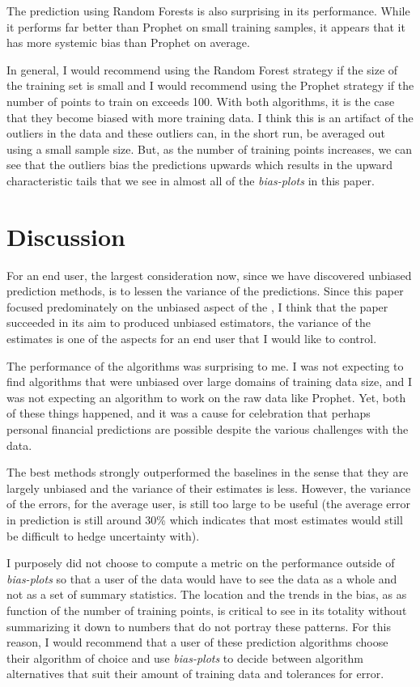 \documentclass[11pt,a4paper]{article}
\newcommand{\bplots}{\textit{bias-plots}\xspace}
\begin{document}
The \yinyang prediction using Random Forests is also surprising in its performance. While it performs far better than Prophet on small training samples, it appears that it has more systemic bias than Prophet on average. 

In general, I would recommend using the \yinyang Random Forest strategy if the size of the training set is small and I would recommend using the Prophet strategy if the number of points to train on exceeds 100. With both algorithms, it is the case that they become biased with more training data. I think this is an artifact of the outliers in the data and these outliers can, in the short run, be averaged out using a small sample size. But, as the number of training points increases, we can see that the outliers bias the predictions upwards which results in the upward characteristic tails that we see in almost all of the \bplots in this paper. 




\section{Discussion}

For an end user, the largest consideration now, since we have discovered unbiased prediction methods, is to lessen the variance of the predictions. Since this paper focused predominately on the unbiased aspect of the \preprob, I think that the paper succeeded in its aim to produced unbiased estimators, the variance of the estimates is one of the aspects for an end user that I would like to control. 

The performance of the algorithms was surprising to me. I was not expecting to find algorithms that were unbiased over large domains of training data size, and I was not expecting an algorithm to work on the raw data like Prophet. Yet, both of these things happened, and it was a cause for celebration that perhaps personal financial predictions are possible despite the various challenges with the data. 

The best methods strongly outperformed the baselines in the sense that they are largely unbiased and the variance of their estimates is less. However, the variance of the errors, for the average user, is still too large to be useful (the average error in prediction is still around 30\% which indicates that most estimates would still be difficult to hedge uncertainty with). 

I purposely did not choose to compute a metric on the performance outside of \bplots so that a user of the data would have to see the data as a whole and not as a set of summary statistics. The location and the trends in the bias, as as function of the number of training points, is critical to see in its totality without summarizing it down to numbers that do not portray these patterns. For this reason, I would recommend that a user of these prediction algorithms choose their algorithm of choice and use \bplots to decide between algorithm alternatives that suit their amount of training data and tolerances for error. 
\end{document}
